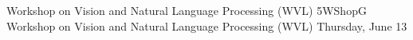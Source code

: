 \begin{wsschedule}
{Workshop on Vision and Natural Language Processing (WVL)}
{5}{WShopG}
{Workshop on Vision and Natural Language Processing (WVL)}
{Thursday, June 13}{\WShopLocG}

\end{wsschedule}
